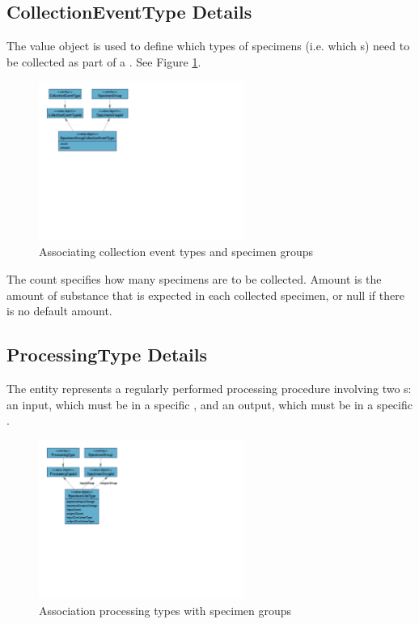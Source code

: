 \subsection{CollectionEventType Details}
\label{sec:collection-event-type}

The \texttt{\textbf{}} value
object is used to define which types of specimens (i.e. which
s) need to be collected as part of a
. See Figure \ref{fig:collection-event-type}.

\begin{figure}[h]
  \centering
  \includegraphics[trim={9mm 118mm 158mm 9mm}, clip,
    width=0.6\textwidth]{images/collection-event-type}
  \caption{Associating collection event types and specimen groups}
  \label{fig:collection-event-type}
\end{figure}

The count specifies how many specimens are to be collected. Amount is the
amount of substance that is expected in each collected specimen, or null if
there is no default amount.
\clearpage

\subsection{ProcessingType Details}
\label{sec:Processing-type}

The \texttt{\textbf{}} entity represents a
regularly performed processing procedure involving two s:
an input, which must be in a specific , and an
output, which must be in a specific .

\begin{figure}[H]
  \centering
  \includegraphics[trim={9mm 100mm 172mm 9mm}, clip,
    width=0.6\textwidth]{images/processing-type}
  \caption{Association processing types with specimen groups}
  \label{fig:processing-type}
\end{figure}

